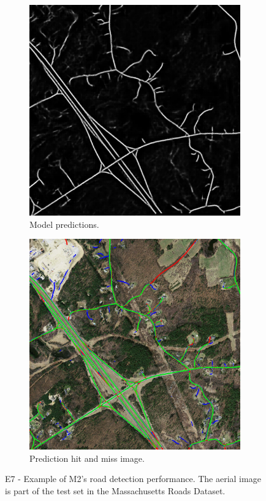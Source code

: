 \begin{figure}
\begin{subfigure}{0.48\textwidth}
\includegraphics[width=\textwidth]{figs/E7/E7-pred.jpg}
\caption{Model predictions.} \label{fig:E7_model_predictions}
\end{subfigure}
\hspace*{\fill} %
\begin{subfigure}{0.48\textwidth}
\includegraphics[width=\textwidth]{figs/E7/E7-hit.jpg}
\caption{Prediction hit and miss image.} \label{fig:E7_hit_image}
\end{subfigure}
\caption[E7 - Qualitiative results of the road extraction system ]{E7 - Example of M2's road detection performance. The aerial image is part of the test set in the Massachusetts Roads Dataset.} \label{fig:E7_performance}
\end{figure}

